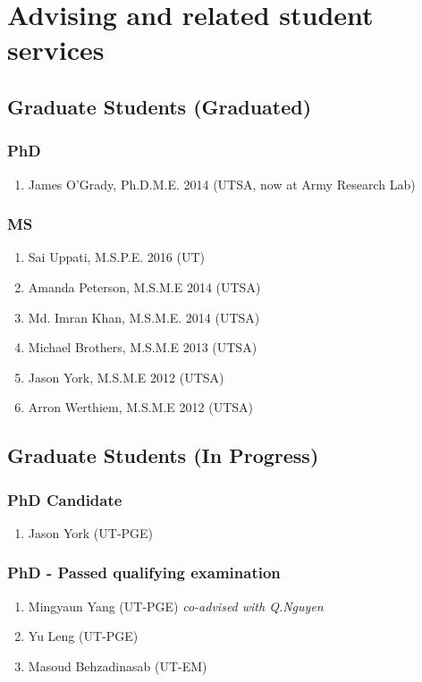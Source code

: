 \section*{Advising and related student services}



\subsection*{Graduate Students (Graduated)}

\subsubsection*{PhD}
\begin{enumerate}
    \item James O'Grady, Ph.D.M.E. 2014 (UTSA, now at Army Research Lab)
\end{enumerate}

\subsubsection*{MS}
\begin{enumerate}
    \item Sai Uppati, M.S.P.E. 2016 (UT)
    \item Amanda Peterson, M.S.M.E 2014 (UTSA)
    \item Md. Imran Khan, M.S.M.E. 2014 (UTSA)
    \item Michael Brothers, M.S.M.E 2013 (UTSA)
    \item Jason York, M.S.M.E 2012 (UTSA)
    \item Arron Werthiem, M.S.M.E 2012 (UTSA)
\end{enumerate}

\subsection*{Graduate Students (In Progress)}

\subsubsection*{PhD Candidate}
\begin{enumerate}
    \item Jason York (UT-PGE)
\end{enumerate}

\subsubsection*{PhD - Passed qualifying examination}
\begin{enumerate}
    \item Mingyaun Yang (UT-PGE) \emph{co-advised with Q.Nguyen}
    \item Yu Leng (UT-PGE)
    \item Masoud Behzadinasab (UT-EM)
\end{enumerate}

